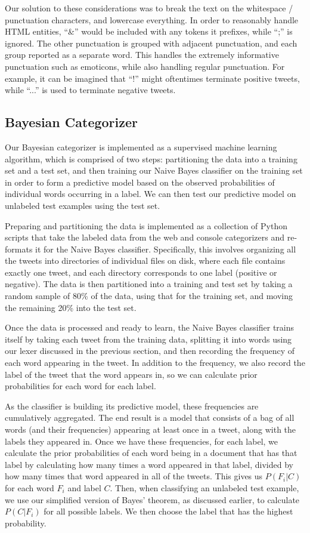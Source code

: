 \documentclass[12pt,a4paper]{article}
\begin{document}
Our solution to these considerations was to break the text on the whitespace / punctuation characters, and lowercase everything.  In order to reasonably handle HTML entities, ``\&'' would be included with any tokens it prefixes, while ``;'' is ignored.  The other punctuation is grouped with adjacent punctuation, and each group reported as a separate word.  This handles the extremely informative punctuation such as emoticons, while also handling regular punctuation.  For example, it can be imagined that ``!'' might oftentimes terminate positive tweets, while ``...'' is used to terminate negative tweets.

\subsection { Bayesian Categorizer }

Our Bayesian categorizer is implemented as a supervised machine learning algorithm, which is comprised of two steps: partitioning the data into a training set and a test set, and then training our Naive Bayes classifier on the training set in order to form a predictive model based on the observed probabilities of individual words occurring in a label. We can then test our predictive model on unlabeled test examples using the test set.

Preparing and partitioning the data is implemented as a collection of Python scripts that take the labeled data from the web and console categorizers and re-formats it for the Naive Bayes classifier. Specifically, this involves organizing all the tweets into directories of individual files on disk, where each file contains exactly one tweet, and each directory corresponds to one label (positive or negative). The data is then partitioned into a training and test set by taking a random sample of 80\% of the data, using that for the training set, and moving the remaining 20\% into the test set.

Once the data is processed and ready to learn, the Naive Bayes classifier trains itself by taking each tweet from the training data, splitting it into words using our lexer discussed in the previous section, and then recording the frequency of each word appearing in the tweet. In addition to the frequency, we also record the label of the tweet that the word appears in, so we can calculate prior probabilities for each word for each label.

As the classifier is building its predictive model, these frequencies are cumulatively aggregated. The end result is a model that consists of a bag of all words (and their frequencies) appearing at least once in a tweet, along with the labels they appeared in. Once we have these frequencies, for each label, we calculate the prior probabilities of each word being in a document that has that label by calculating how many times a word appeared in that label, divided by how many times that word appeared in all of the tweets. This gives us $P(F_i | C)$ for each word $F_i$ and label $C$. Then, when classifying an unlabeled test example, we use our simplified version of Bayes' theorem, as discussed earlier, to calculate $P(C | F_i)$ for all possible labels. We then choose the label that has the highest probability.
\end{document}
